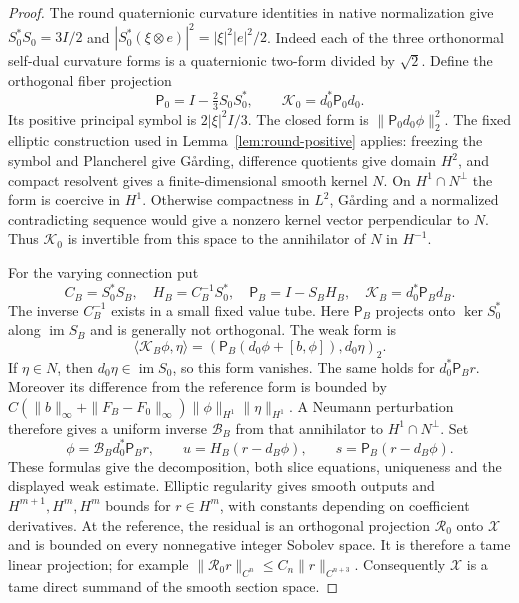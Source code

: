 \documentclass[11pt]{article}
\numberwithin{equation}{section}
\theoremstyle{definition}
\theoremstyle{remark}
\begin{document}
\begin{proof}
The round quaternionic curvature identities in native
normalization give
$S_0^*S_0=3I/2$ and
$|S_0^*(\xi\otimes e)|^2=|\xi|^2|e|^2/2$.
Indeed each of the three orthonormal self-dual curvature
forms is a quaternionic two-form divided by $\sqrt2$.
Define the orthogonal fiber projection
\[
 \mathsf P_0=I-\tfrac23 S_0S_0^*,\qquad
 \mathcal K_0=d_0^*\mathsf P_0d_0 .
\]
Its positive principal symbol is $2|\xi|^2I/3$.
The closed form is $\|\mathsf P_0d_0\phi\|_2^2$.
The fixed elliptic construction used in
Lemma~\ref{lem:round-positive} applies: freezing the
symbol and Plancherel give G{\aa}rding, difference
quotients give domain $H^2$, and compact resolvent
gives a finite-dimensional smooth kernel $N$.
On $H^1\cap N^\perp$ the form is coercive in $H^1$.
Otherwise compactness in $L^2$, G{\aa}rding and a
normalized contradicting sequence would give a
nonzero kernel vector perpendicular to $N$.
Thus $\mathcal K_0$ is invertible from this space to
the annihilator of $N$ in $H^{-1}$.

For the varying connection put
\[
 C_B=S_0^*S_B,\quad H_B=C_B^{-1}S_0^*,\quad
 \mathsf P_B=I-S_BH_B,\quad
 \mathcal K_B=d_0^*\mathsf P_Bd_B .
\]
The inverse $C_B^{-1}$ exists in a small fixed value
tube. Here $\mathsf P_B$ projects onto $\ker S_0^*$
along $\operatorname{im}S_B$ and is generally
not orthogonal. The weak form is
\[
 \langle\mathcal K_B\phi,\eta\rangle
    =(\mathsf P_B(d_0\phi+[b,\phi]),d_0\eta)_2 .
\]
If $\eta\in N$, then $d_0\eta\in\operatorname{im}S_0$,
so this form vanishes. The same holds for
$d_0^*\mathsf P_Br$. Moreover its difference from
the reference form is bounded by
$C(\|b\|_\infty+\|F_B-F_0\|_\infty)
\|\phi\|_{H^1}\|\eta\|_{H^1}$.
A Neumann perturbation therefore gives a uniform
inverse $\mathcal B_B$ from that annihilator to
$H^1\cap N^\perp$.
Set
\[
 \phi=\mathcal B_Bd_0^*\mathsf P_Br,\qquad
 u=H_B(r-d_B\phi),\qquad
 s=\mathsf P_B(r-d_B\phi).
\]
These formulas give the decomposition, both slice
equations, uniqueness and the displayed weak estimate.
Elliptic regularity gives smooth outputs and
$H^{m+1},H^m,H^m$ bounds for $r\in H^m$,
with constants depending on coefficient derivatives.
At the reference, the residual is an orthogonal
projection $\mathcal R_0$ onto $\mathcal X$ and is
bounded on every nonnegative integer Sobolev space.
It is therefore a tame linear projection; for example
$\|\mathcal R_0r\|_{C^n}\le C_n\|r\|_{C^{n+3}}$.
Consequently $\mathcal X$ is a tame direct summand
of the smooth section space.


\end{proof}
\end{document}
